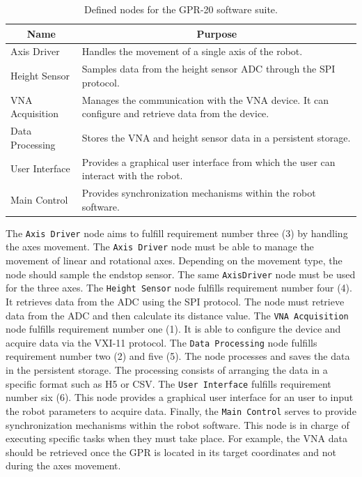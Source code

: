\documentclass{article}
\begin{document}
\begin{table}[h]
    \centering
    \begin{tabular}{|l|p{10cm}|}
        \hline  \multicolumn{1}{|c|}{\textbf{Name}} & \multicolumn{1}{c|}{\textbf{Purpose}} \\ \hline
        Axis Driver & Handles the movement of a single axis of the robot. \\ \hline
        Height Sensor & Samples data from the height sensor ADC through the SPI protocol. \\ \hline
        VNA Acquisition & Manages the communication with the VNA device. It can configure and retrieve data from the device. \\ \hline
        Data Processing & Stores the VNA and height sensor data in a persistent storage. \\ \hline
        User Interface & Provides a graphical user interface from which the user can interact with the robot. \\ \hline
        Main Control & Provides synchronization mechanisms within the robot software. \\ \hline
    \end{tabular}
    \caption{Defined nodes for the GPR-20 software suite.}
    \label{tab:software_nodes}
\end{table}

The \texttt{Axis Driver} node aims to fulfill requirement number three (3) by handling the axes movement. The \texttt{Axis Driver} node must be able to manage the movement of linear and rotational axes. Depending on the movement type, the node should sample the endstop sensor. The same \texttt{AxisDriver} node must be used for the three axes. The \texttt{Height Sensor} node fulfills requirement number four (4). It retrieves data from the ADC using the SPI protocol. The node must retrieve data from the ADC and then calculate its distance value. The \texttt{VNA Acquisition} node fulfills requirement number one (1). It is able to configure the device and acquire data via the VXI-11 protocol. The \texttt{Data Processing} node fulfills requirement number two (2) and five (5). The node processes and saves the data in the persistent storage. The processing consists of arranging the data in a specific format such as H5 or CSV. The \texttt{User Interface} fulfills requirement number six (6). This node provides a graphical user interface for an user to input the robot parameters to acquire data. Finally, the \texttt{Main Control} serves to provide synchronization mechanisms within the robot software. This node is in charge of executing specific tasks when they must take place. For example, the VNA data should be retrieved once the GPR is located in its target coordinates and not during the axes movement.
\end{document}
